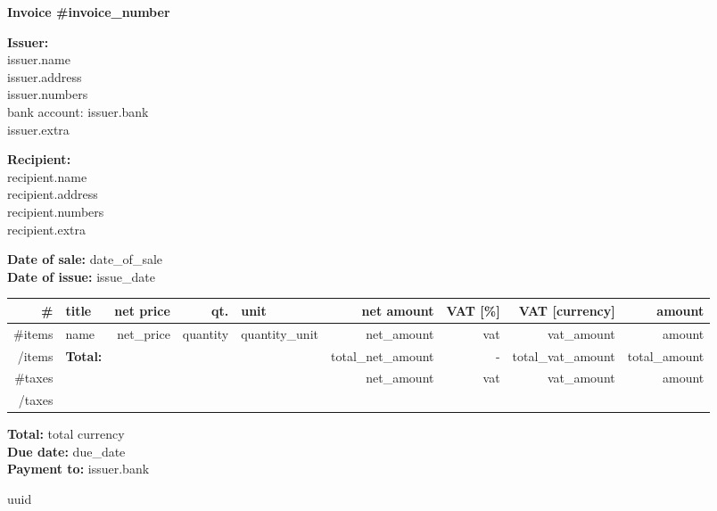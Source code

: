 \documentclass[11pt]{article}
\begin{document}
\begin{center}
  \Large
  \textbf{Invoice \#{{invoice_number}}}
\end{center}

\textbf{Issuer:} \\
       {{issuer.name}} \\
       {{issuer.address}} \\
       {{issuer.numbers}} \\
       bank account: {{issuer.bank}} \\
       {{issuer.extra}}

\textbf{Recipient:} \\
       {{recipient.name}} \\
       {{recipient.address}} \\
       {{recipient.numbers}} \\
       {{recipient.extra}}

\textbf{Date of sale:} {{date_of_sale}} \\
\textbf{Date of issue:} {{issue_date}}

\newcommand{\itemindex}{\stepcounter{ItemIndex} \theItemIndex}

\begin{center}
  \small
  \begin{tabular}{rlrrlrrrr}
    \# & title & net price & qt. & unit & net amount & VAT [\%] & VAT [{{currency}}] & amount \\
    \hline
    {{#items}}
     \itemindex & {{name}} & {{net_price}} & {{quantity}} & {{quantity_unit}} & {{net_amount}} & {{vat}} & {{vat_amount}} & {{amount}} \\
    {{/items}}

    \hline
    & \textbf{Total:} &  &  &  & {{total_net_amount}} & - & {{total_vat_amount}} & {{total_amount}} \\
    {{#taxes}}
      &  &  &  &  & {{net_amount}} & {{vat}} & {{vat_amount}} & {{amount}} \\
    {{/taxes}}
  \end{tabular}
\end{center}

\textbf{Total:} {{total}} {{currency}} \\
\textbf{Due date:} {{due_date}} \\
\textbf{Payment to:} {{issuer.bank}}

\begin{center}
  \tiny
  {{uuid}}
\end{center}
\end{document}
